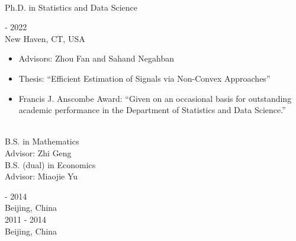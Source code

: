 \documentclass{article}
\begin{document}
\begin{minipage}{0.65\linewidth}
\\
Ph.D. in Statistics and Data Science\\
\end{minipage}\hfill
\begin{minipage}{0.34\linewidth}
 - 2022\\
New Haven, CT, USA\\
\end{minipage}
\vspace{-6mm}
\begin{itemize}
\setlength{\itemsep}{-0.5mm}
\item[\raisebox{0.25ex}{\tiny$\bullet$}] Advisors: Zhou Fan and Sahand Negahban
\item[\raisebox{0.25ex}{\tiny$\bullet$}] Thesis: ``Efficient Estimation of Signals via Non-Convex Approaches''
\item[\raisebox{0.25ex}{\tiny$\bullet$}] Francis J. Anscombe Award: “Given on an occasional basis for outstanding academic performance in the Department of Statistics and Data Science.”
\end{itemize}

\begin{minipage}{0.65\linewidth}
\\
B.S. in Mathematics\\
Advisor: Zhi Geng\\
B.S. (dual) in Economics\\
Advisor: Miaojie Yu\\
\end{minipage}\hfill
\begin{minipage}{0.34\linewidth}
 - 2014\\
Beijing, China\\
2011 - 2014\\
Beijing, China\\
\end{minipage}








\end{document}
